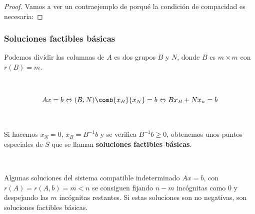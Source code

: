 \begin{proof}
Vamos a ver un contraejemplo de porqué la condición de compacidad es necesaria:


%
%
\end{proof}

\begin{figure}[h]
\centering
{}
\end{figure}



\subsubsection{Soluciones factibles básicas}

Podemos dividir las columnas de $A$ es dos grupos $B$ y $N$, donde $B$ es $m\times m$ con $r(B)=m$.

\

\[
Ax=b \Leftrightarrow (B,N) {\comb{x_B}{x_N}}=b \Leftrightarrow B x_B + Nx_n = b 
\]

\

Si hacemos $x_N=0$, $x_B=B^{-1}b$ y se verifica $B^{-1}b\geq 0$, obtenemos unos puntos especiales de $S$ que se llaman  \textbf{soluciones factibles básicas}.

\


Algunas soluciones del sistema compatible indeterminado $Ax=b$, con $r(A)=r(A,b)=m<n$ se consiguen fijando $n-m$ incógnitas como 0 y despejando las $m$ incógnitas restantes. Si estas soluciones son no negativas, son soluciones factibles básicas.


